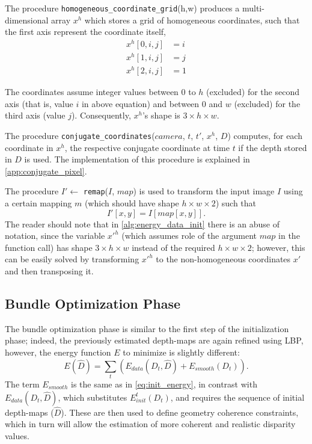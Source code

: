 \documentclass[notitlepage,english]{hgbreport}
\newcommand{\Acronym}[1]{{#1}}
\newcommand{\LBP}{\Acronym{LBP}}
\begin{document}
The procedure \texttt{homogeneous\_coordinate\_grid}(h,w) produces a multi-dimensional array $x^h$ which stores a grid of homogeneous coordinates, such that the first axis represent the coordinate itself, \ie
\begin{align*}
	x^h[0,i,j] &= i\\
	x^h[1,i,j] &= j\\
	x^h[2,i,j] &= 1
\end{align*}

The coordinates assume integer values between $0$ to $h$ (excluded) for the second axis (that is, value $i$ in above equation) and between $0$ and $w$ (excluded) for the third axis (value $j$). Consequently, $x^h$'s shape is $3\times h \times w$.

The procedure \texttt{conjugate\_coordinates}($camera$, $t$, $t'$, $x^h$, $D$) computes, for each coordinate in $x^h$, the respective conjugate coordinate at time $t$ if the depth stored in $D$ is used. The implementation of this procedure is explained in \cref{app:conjugate_pixel}.

The procedure $I'\leftarrow$ \texttt{remap}($I$, $map$) is used to transform the input image $I$ using a certain mapping $m$ (which should have shape $h\times w\times 2$) such that
$$I'[x,y] = I[map[x,y]].$$
The reader should note that in \cref{alg:energy_data_init} there is an abuse of notation, since the variable $x'^h$ (which assumes role of the argument $map$ in the function call) has shape $3\times h \times w$ instead of the required $h\times w \times 2$; however, this can be easily solved by transforming $x'^h$ to the non-homogeneous coordinates $x'$ and then transposing it. 


\subsection{Bundle Optimization Phase}
The bundle optimization phase is similar to the first step of the initialization phase; indeed, the previously estimated depth-maps are again refined using \LBP{}, however, the energy function $E$ to minimize is slightly different:
\begin{equation}
	E(\hat D) = \sum_{t} \left(E_{data}(D_t, \hat D) + E_{smooth}(D_t)\right).
\end{equation}
The term $E_{smooth}$ is the same as in \cref{eq:init_energy}, in contrast with $E_{data}(D_t,\hat D)$, which substitutes $E^t_{init}(D_t)$, and requires the sequence of initial depth-maps ($\hat D$). These  are then used to define geometry coherence constraints, which in turn will allow the estimation of more coherent and realistic disparity values.
\end{document}
